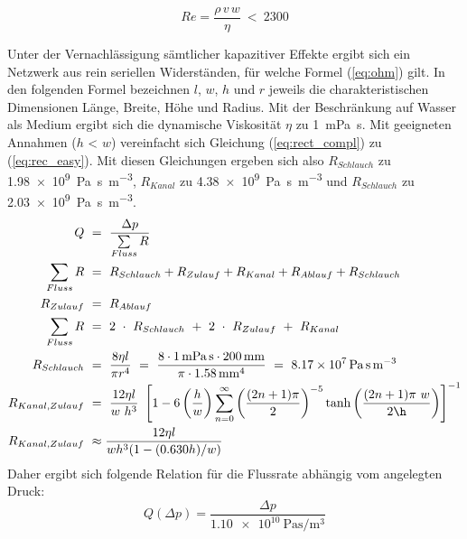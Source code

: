 \begin{equation}
    \mathit{Re} = \frac{\rho \, v \, w}{\eta}\ <\ 2300 \label{eq:reynolds}
\end{equation}
  

Unter der Vernachlässigung sämtlicher kapazitiver Effekte ergibt sich ein Netzwerk aus rein seriellen Widerständen, für welche Formel (\ref{eq:ohm}) gilt.\cite{Kirby2009} In den folgenden Formel bezeichnen $l$, $w$, $h$ und $r$ jeweils die charakteristischen Dimensionen Länge, Breite, Höhe und Radius. Mit der Beschränkung auf Wasser als Medium ergibt sich die dynamische Viskosität $\eta$ zu \SI{1}{\milli\pascal\second}. Mit geeigneten Annahmen ($h$ < $w$) vereinfacht sich Gleichung (\ref{eq:rect_compl}) zu (\ref{eq:rec_easy}).\cite{TheoreticalMicrofluidics} Mit diesen Gleichungen ergeben sich also $R_{Schlauch}$ zu \SI{1.98e9}{\pascal\second\per\cubic\meter}, $R_{Kanal}$ zu \SI{4.38e9}{\pascal\second\per\cubic\meter} und $R_{Schlauch}$ zu \SI{2.03e9}{\pascal\second\per\cubic\meter}.
 \begin{align}
     Q\ &=\ \frac{\Delta p}{\sum\limits_{Fluss} R} \label{eq:ohm}\\
     \sum\limits_{Fluss} R\ &=\ R_{Schlauch}+ R_{Zulauf} +R_{Kanal} + R_{Ablauf} + R_{Schlauch}\\
     R_{Zulauf}\ &=\ R_{Ablauf} \\
     \sum\limits_{Fluss} R\ &=\ 2\ \cdot\ R_{Schlauch}\ +\ 2\ \cdot\ R_{Zulauf}\ +\ R_{Kanal}\\
     R_{Schlauch}\ &=\ \frac{8\eta l}{\pi r^4}\ =\ \frac{8\cdot\SI{1}{\milli\pascal\second} \cdot \SI{200}{\milli\meter}}{\pi \cdot \SI{1.58}{\milli\meter}^4}\ =\ \SI{8.17e7}{\pascal\second\per\cubic\meter} \\
     R_{Kanal, Zulauf}\ &=\ \frac{12 \eta l}{w\ h^3}\ \left[1-6 \left(\frac{h}{w}\right) \sum\limits_{n=0}^{\infty} \left( \frac{(2n+1)\pi}{2} \right)^{-5} \tanh{ \left( \frac{(2n+1)\pi\ w}{2\h} \right) } \right]^{-1} \label{eq:rect_compl}\\
     R_{Kanal, Zulauf}\ &\approx \frac{12 \eta l}{w h^3(1-(0.630h)/w)} \label{eq:rec_easy} 
 \end{align}
 Daher ergibt sich folgende Relation für die Flussrate abhängig vom angelegten Druck:
 \begin{equation}
     Q(\Delta p) = \frac{\Delta p}{\SI{1.10e10}{\pascal\second\per\cubic\meter}}
 \end{equation}